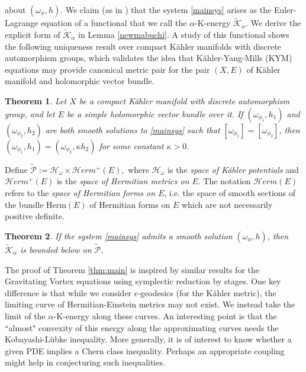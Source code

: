 \documentclass[10pt, letterpaper]{amsart}
\theoremstyle{plain}
\newtheorem{theorem}{Theorem}[section]
\theoremstyle{definition}
\numberwithin{equation}{section}
\begin{document}
about $\left(\omega_\phi, h\right)$. We claim (as in \cite{Garcia1, Garcia2}) that the system \eqref{mainsys} arises as the Euler-Lagrange equation of a functional that we call the $\alpha$-K-energy $\widetilde{\mathcal{K}}_\alpha$. We derive the explicit form of  $\widetilde{\mathcal{K}}_\alpha$ in Lemma \ref{newmabuchi}. A study of this functional shows the following uniqueness result over compact K\"ahler manifolds with discrete automorphism groups, which validates the idea that K\"ahler-Yang-Mills (KYM) equations may provide canonical metric pair for the pair $(X,E)$ of K\"ahler manifold and holomorphic vector bundle.
\begin{theorem}
\label{thm:uniqueness}
Let $X$ be a compact K\"ahler manifold with discrete automorphism group, and let $E$ be a simple holomorphic vector bundle over it. If $\left(\omega_{\phi_1},h_1\right)$ and $\left(\omega_{\phi_2},h_2\right)$ are both smooth solutions to \eqref{mainsys} such that $\left[\omega_{\phi_1}\right]=\left[\omega_{\phi_2}\right]$, then $\left(\omega_{\phi_1},h_1\right)=\left(\omega_{\phi_2},\kappa h_2\right)$ for some constant $\kappa>0$.
\label{thm:main}
\end{theorem}
Define $\widetilde{\mathcal{P}}:=\mathcal{H}_{\omega}\times \mathcal{H}erm^+\left(E\right),$
where $\mathcal{H}_\omega$ is the \emph{space of K\"ahler potentials} and $\mathcal{H}erm^+\left(E\right)$ is the \emph{space of Hermitian metrics on $E$}. The notation $\mathcal{H}erm\left(E\right)$ refers to the \emph{space of Hermitian forms on $E$}, i.e. the space of smooth sections of the bundle $\text{Herm}\left(E\right)$ of Hermitian forms on $E$ which are not necessarily positive definite.
\begin{theorem} 
If the system \eqref{mainsys} admits a smooth solution $\left(\omega_\phi, h\right)$, then $\widetilde{\mathcal{K}}_\alpha$ is bounded below on $\widetilde{\mathcal{P}}$.
\label{thm:existence-implies-lowerbound}
\end{theorem}
The proof of Theorem \ref{thm:main} is inspired by similar results for the Gravitating Vortex equations \cite{AllGV} using symplectic reduction by stages. One key difference is that while we consider $\epsilon$-geodesics (for the K\"ahler metric), the limiting curve of Hermitian-Einstein metrics may not exist. We instead take the limit of the $\alpha$-K-energy along these curves. An interesting point is that the ``almost" convexity of this energy along the approximating curves needs the Kobayashi-L\"ubke inequality. More generally, it is of interest to know whether a given PDE implies a Chern class inequality. Perhaps an appropriate coupling might help in conjecturing such inequalities.\\
\end{document}
